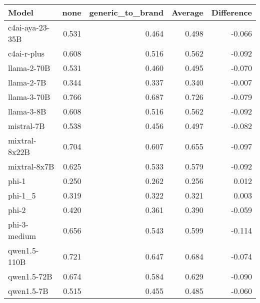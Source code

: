 \begin{tabular}{lrrrr}
\toprule
Model & none & generic_to_brand & Average & Difference \\
\midrule
c4ai-aya-23-35B & 0.531 & 0.464 & 0.498 & -0.066 \\
c4ai-r-plus & 0.608 & 0.516 & 0.562 & -0.092 \\
llama-2-70B & 0.531 & 0.460 & 0.495 & -0.070 \\
llama-2-7B & 0.344 & 0.337 & 0.340 & -0.007 \\
llama-3-70B & 0.766 & 0.687 & 0.726 & -0.079 \\
llama-3-8B & 0.608 & 0.516 & 0.562 & -0.092 \\
mistral-7B & 0.538 & 0.456 & 0.497 & -0.082 \\
mixtral-8x22B & 0.704 & 0.607 & 0.655 & -0.097 \\
mixtral-8x7B & 0.625 & 0.533 & 0.579 & -0.092 \\
phi-1 & 0.250 & 0.262 & 0.256 & 0.012 \\
phi-1_5 & 0.319 & 0.322 & 0.321 & 0.003 \\
phi-2 & 0.420 & 0.361 & 0.390 & -0.059 \\
phi-3-medium & 0.656 & 0.543 & 0.599 & -0.114 \\
qwen1.5-110B & 0.721 & 0.647 & 0.684 & -0.074 \\
qwen1.5-72B & 0.674 & 0.584 & 0.629 & -0.090 \\
qwen1.5-7B & 0.515 & 0.455 & 0.485 & -0.060 \\
\bottomrule
\end{tabular}
